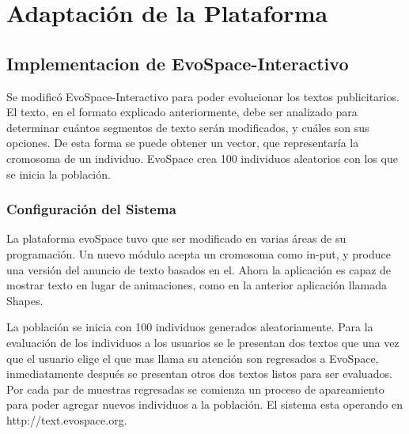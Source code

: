 

\chapter{Adaptación de la Plataforma}


\section{Implementacion de EvoSpace-Interactivo}

Se modificó EvoSpace-Interactivo para poder evolucionar los textos publicitarios. El texto, en el formato explicado anteriormente, debe ser analizado para determinar cuántos segmentos de texto serán modificados, y cuáles son sus opciones. De esta forma se puede obtener un vector, que representaría la cromosoma de un individuo. EvoSpace crea 100 individuos aleatorios con los que se inicia la población. 

\clearpage
\subsection{Configuración del Sistema}

La plataforma evoSpace \cite{romero2014using} tuvo que ser modificado en varias áreas de su programación. Un nuevo módulo acepta un cromosoma como in-put, y produce una versión del anuncio de texto basados en el. Ahora la aplicación es capaz de mostrar texto en lugar de animaciones, como en la anterior aplicación llamada Shapes. 

La población se inicia con 100 individuos generados aleatoriamente. Para la evaluación de los individuos a los usuarios se le presentan dos textos  que una vez que el usuario elige el que mas llama su atención son regresados a EvoSpace, inmediatamente después se presentan otros dos textos listos para ser evaluados. Por cada par de muestras regresadas se comienza un proceso de apareamiento para poder agregar nuevos individuos a la población. El sistema esta operando en http://text.evospace.org.

